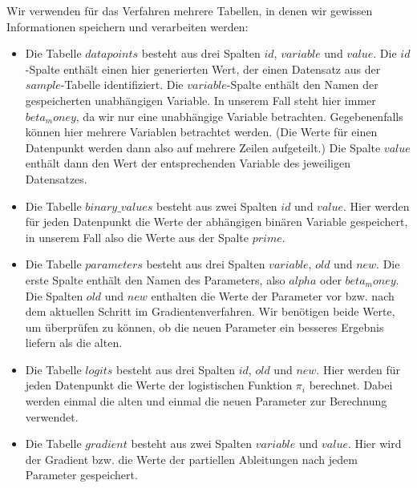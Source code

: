 Wir verwenden für das Verfahren mehrere Tabellen, in denen wir gewissen Informationen speichern und verarbeiten werden:
\begin{itemize}
  \item Die Tabelle $datapoints$ besteht aus drei Spalten $id$, $variable$ und $value$. Die $id$-Spalte enthält einen hier generierten Wert, der einen Datensatz aus der $sample$-Tabelle identifiziert. Die $variable$-Spalte enthält den Namen der gespeicherten unabhängigen Variable. In unserem Fall steht hier immer $beta_money$, da wir nur eine unabhängige Variable betrachten. Gegebenenfalls können hier mehrere Variablen betrachtet werden. (Die Werte für einen Datenpunkt werden dann also auf mehrere Zeilen aufgeteilt.) Die Spalte $value$ enthält dann den Wert der entsprechenden Variable des jeweiligen Datensatzes.
  \item Die Tabelle $binary\_values$ besteht aus zwei Spalten $id$ und $value$. Hier werden für jeden Datenpunkt die Werte der abhängigen binären Variable gespeichert, in unserem Fall also die Werte aus der Spalte $prime$.
  \item Die Tabelle $parameters$ besteht aus drei Spalten $variable$, $old$ und $new$. Die erste Spalte enthält den Namen des Parameters, also $alpha$ oder $beta_money$. Die Spalten $old$ und $new$ enthalten die Werte der Parameter vor bzw. nach dem aktuellen Schritt im Gradientenverfahren. Wir benötigen beide Werte, um überprüfen zu können, ob die neuen Parameter ein besseres Ergebnis liefern als die alten.
  \item Die Tabelle $logits$ besteht aus drei Spalten $id$, $old$ und $new$. Hier werden für jeden Datenpunkt die Werte der logistischen Funktion $\pi_i$ berechnet. Dabei werden einmal die alten und einmal die neuen Parameter zur Berechnung verwendet.
  \item Die Tabelle $gradient$ besteht aus zwei Spalten $variable$ und $value$. Hier wird der Gradient bzw. die Werte der partiellen Ableitungen nach jedem Parameter gespeichert.
\end{itemize}

